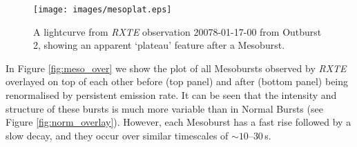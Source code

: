 \begin{figure}
  \centering
  \texttt{[image: images/mesoplat.eps]}
  \caption[A lightcurve from \textit{RXTE} observation 20078-01-17-00 from Outburst 2, showing an apparent `plateau' feature after a Mesoburst.]{\small A lightcurve from \textit{RXTE} observation 20078-01-17-00 from Outburst 2, showing an apparent `plateau' feature after a Mesoburst.}
  \label{fig:mesoplateau}
\end{figure}

\par In Figure \ref{fig:meso_over} we show the plot of all Mesobursts observed by \textit{RXTE} overlayed on top of each other before (top panel) and after (bottom panel) being renormalised by persistent emission rate.  It can be seen that the intensity and structure of these bursts is much more variable than in Normal Bursts (see Figure \ref{fig:norm_overlay}).  However, each Mesoburst has a fast rise followed by a slow decay, and they occur over similar timescales of $\sim10$--$30$\,s.

